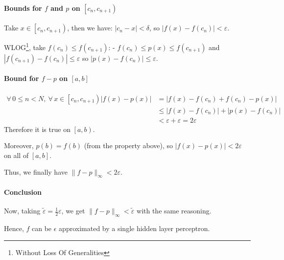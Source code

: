 \documentclass[]{article}
\begin{document}
\paragraph{Bounds for $f$ and $p$ on $\left[ c_n, c_{n+1} \right)$}
Take $x \in \left[ c_n, c_{n+1} \right)$, then we have: $|c_n - x| < \delta$, so $|f(x) - f(c_n)| < \varepsilon$.

WLOG\footnote{Without Loss Of Generalities}, take $f(c_n) \leq f(c_{n+1})$:
- $f(c_n) \leq p(x) \leq f(c_{n+1})$ and $|f(c_{n+1}) - f(c_n)| \leq \varepsilon$ so $|p(x) - f(c_n)| \leq \varepsilon$.

\paragraph{Bound for $f - p$ on $\left[ a,b \right]$}
\begin{align*}
	\forall\, 0 \leq n < N, \ \forall\, x \in \left[ c_n, c_{n+1} \right) |f(x) - p(x)| &= |f(x) - f(c_n) + f(c_n) - p(x)| \\
	&\leq |f(x) - f(c_n)| + |p(x) - f(c_n)| \\
	&< \varepsilon + \varepsilon = 2\varepsilon
\end{align*}
Therefore it is true on $\left[ a,b \right)$.

Moreover, $p(b) = f(b)$ (from the property above), so $|f(x) - p(x)| < 2\varepsilon$ on all of $\left[ a,b \right]$.

Thus, we finally have $\|f-p\|_\infty < 2\varepsilon$.

\paragraph{Conclusion}
Now, taking $\tilde{\varepsilon} = \frac{1}{2}\varepsilon$, we get $\|f-p\|_\infty < \tilde{\varepsilon}$ with the same reasoning.

Hence, $f$ can be $\epsilon$ approximated by a single hidden layer perceptron.
\end{document}
